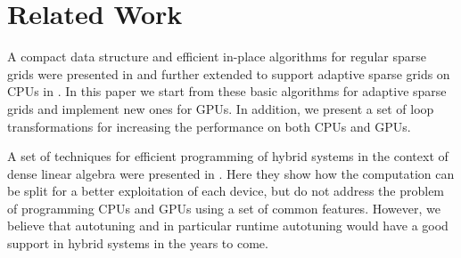 \section{Related Work}
A compact data structure and efficient in-place algorithms for regular sparse
grids were presented in \cite{Murarasu:2011:CDS:1941553.1941559} and further extended to support
adaptive sparse grids on CPUs in \cite{murarasu12fastsg:}. In this paper we start
from these basic algorithms for adaptive sparse grids and implement new ones for
GPUs. In addition, we present a set of loop transformations for increasing
the performance on both CPUs and GPUs.

A set of techniques for efficient programming of hybrid systems in the context
of dense linear algebra were presented in \cite{Tomov:2010:TDL:1805333.1805388}.
Here they show how the computation can be split for a better exploitation of
each device, but do not address the problem of programming CPUs and GPUs using a
set of common features. However, we believe that autotuning and in particular
runtime autotuning would have a good support in hybrid systems in the years to
come.


